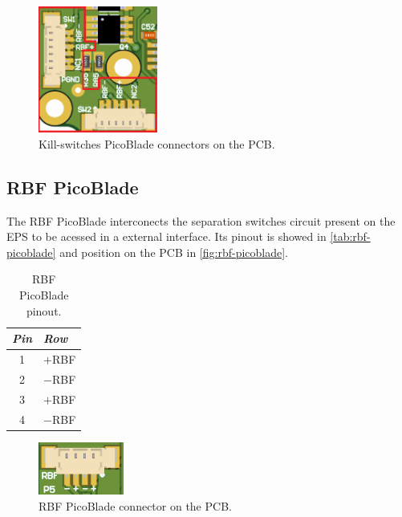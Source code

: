 \begin{figure}[!ht]
    \begin{center}
        \includegraphics[width=0.35\textwidth]{figures/kill-switches-picoblades-3d.png}
        \caption{Kill-switches PicoBlade connectors on the PCB.}
        \label{fig:kill-switches-picoblades}
    \end{center}
\end{figure}

\subsection{RBF PicoBlade} \label{rbf-picoblade}

The RBF PicoBlade interconects the separation switches circuit present on the EPS to be acessed in a external interface. Its pinout is showed in \autoref{tab:rbf-picoblade} and position on the PCB in \autoref{fig:rbf-picoblade}.

\begin{table}[!h]
    \centering
    \begin{tabular}{cl}
        \toprule[1.5pt]
        \textit{Pin} & \textit{Row} \\
        \midrule
        1            & $+$RBF \\
        2            & $-$RBF \\
        3            & $+$RBF \\
        4            & $-$RBF \\
        \bottomrule[1.5pt]
    \end{tabular}
    \caption{RBF PicoBlade pinout.}
    \label{tab:rbf-picoblade}
\end{table}

\begin{figure}[!ht]
    \begin{center}
        \includegraphics[width=0.25\textwidth]{figures/rbf-picoblades-3d.png}
        \caption{RBF PicoBlade connector on the PCB.}
        \label{fig:rbf-picoblade}
    \end{center}
\end{figure}

